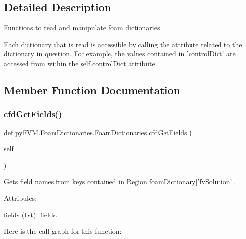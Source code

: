 \subsection{Detailed Description}
\begin{DoxyVerb}Functions to read and manipulate foam dictionaries.

Each dictionary that is read is accessible by calling the attribute related to the dictionary in question. For example, the values contained in 'controlDict' are accessed from within the self.controlDict attribute.  
\end{DoxyVerb}
 

\subsection{Member Function Documentation}
\mbox{\label{classpy_f_v_m_1_1_foam_dictionaries_1_1_foam_dictionaries_acd0e5c0be262249022d98cfd7be21de6}} 
\subsubsection{\texorpdfstring{cfdGetFields()}{cfdGetFields()}}
{\footnotesize\ttfamily def py\+F\+V\+M.\+Foam\+Dictionaries.\+Foam\+Dictionaries.\+cfd\+Get\+Fields (\begin{DoxyParamCaption}\item[{}]{self }\end{DoxyParamCaption})}

\begin{DoxyVerb}Gets field names from keys contained in Region.foamDictionary['fvSolution'].

Attributes:
    
   fields (list): fields.\end{DoxyVerb}
 Here is the call graph for this function\+:
\mbox{\label{classpy_f_v_m_1_1_foam_dictionaries_1_1_foam_dictionaries_abf1810532990f184f1cb6baa64e1c890}} 
